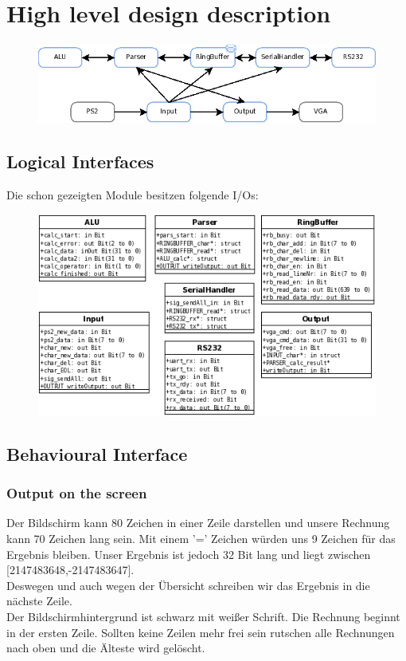 \section{High level design description}
\begin{figure}[!ht]
 \includegraphics[scale=0.55]{pics/Modules.png}
 \label{fig:Modules}
\end{figure}

\subsection{Logical Interfaces}
Die schon gezeigten Module besitzen folgende I/Os:
\begin{figure}[!ht]
 \includegraphics[scale=0.7]{pics/Klassen.png}
 \label{fig:Klassen}
\end{figure}


\subsection{Behavioural Interface}
\subsubsection{Output on the screen}
Der Bildschirm kann 80 Zeichen in einer Zeile darstellen und unsere Rechnung kann 70 Zeichen lang sein. Mit einem '=' Zeichen würden uns 9 Zeichen für das Ergebnis bleiben. Unser Ergebnis ist jedoch 32 Bit lang und liegt zwischen [2147483648,-2147483647].\\
Deswegen und auch wegen der Übersicht schreiben wir das Ergebnis in die nächste Zeile.\\
Der Bildschirmhintergrund ist schwarz mit weißer Schrift. Die Rechnung beginnt in der ersten Zeile. Sollten keine Zeilen mehr frei sein rutschen alle Rechnungen nach oben und die Älteste wird gelöscht.
